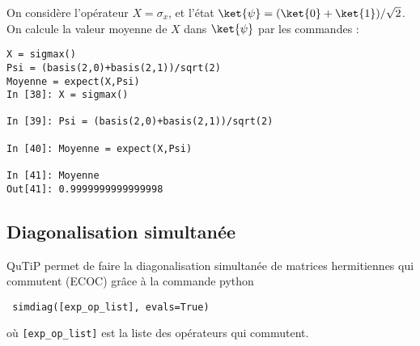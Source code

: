 \begin{example}
On considère l'opérateur $X=\sigma_x$, et l'état 
$\ket{\psi}=(\ket{0}+\ket{1})/\sqrt{2}$. On calcule la valeur moyenne de $X$ 
dans $\ket{\psi}$ par les commandes :\\
\begin{lstlisting}
X = sigmax()
Psi = (basis(2,0)+basis(2,1))/sqrt(2)
Moyenne = expect(X,Psi)
In [38]: X = sigmax()

In [39]: Psi = (basis(2,0)+basis(2,1))/sqrt(2)

In [40]: Moyenne = expect(X,Psi)

In [41]: Moyenne
Out[41]: 0.9999999999999998
\end{lstlisting}
\end{example}

\subsection{Diagonalisation simultanée}

QuTiP permet de faire la diagonalisation simultanée de matrices hermitiennes 
qui commutent (ECOC) grâce à la commande python
\begin{lstlisting}
 simdiag([exp_op_list], evals=True)
\end{lstlisting}
où \texttt{[exp\_op\_list]} est la liste des opérateurs qui commutent.

